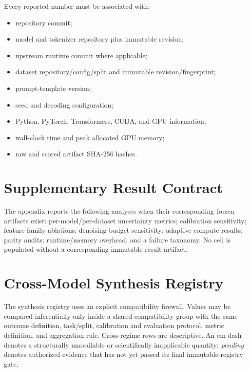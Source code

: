 Every reported number must be associated with:
\begin{itemize}
\item repository commit;
\item model and tokenizer repository plus immutable revision;
\item upstream runtime commit where applicable;
\item dataset repository/config/split and immutable revision/fingerprint;
\item prompt-template version;
\item seed and decoding configuration;
\item Python, PyTorch, Transformers, CUDA, and GPU information;
\item wall-clock time and peak allocated GPU memory;
\item raw and scored artifact SHA-256 hashes.
\end{itemize}

\section{Supplementary Result Contract}

The appendix reports the following analyses when their corresponding frozen artifacts exist:
per-model/per-dataset uncertainty metrics;
calibration sensitivity;
feature-family ablations;
denoising-budget sensitivity;
adaptive-compute results;
parity audits;
runtime/memory overhead;
and a failure taxonomy.
No cell is populated without a corresponding immutable result artifact.

\section{Cross-Model Synthesis Registry}
\label{sec:cross-model-synthesis-appendix}

The synthesis registry uses an explicit compatibility firewall. Values may be
compared inferentially only inside a shared compatibility group with the same
outcome definition, task/split, calibration and evaluation protocol, metric
definition, and aggregation rule. Cross-regime rows are descriptive. An em
dash denotes a structurally unavailable or scientifically inapplicable
quantity; \textit{pending} denotes authorized evidence that has not yet passed
its final immutable-registry gate.

\CrossModelSignalTable

\CrossModelAppendixTable


